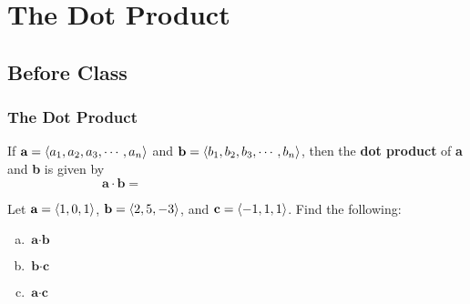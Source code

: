 \documentclass[notes]{subfiles}
\begin{document}
	\fancyhead[LO,RE]{\bfseries \small \currentname}
	\fancyfoot[C]{{}}
	\fancyfoot[RO,LE]{\large \thepage}	%
	
\section*{The Dot Product}\label{cs123}
	\subsection*{Before Class}
	\subsubsection*{The Dot Product}
		\begin{defn}
			If $\textbf{a} = \left\langle a_1,a_2,a_3,\cdots, a_n\right\rangle$ and $\textbf{b} =\left\langle b_1,b_2,b_3,\cdots, b_n\right\rangle$, then the \textbf{dot product} of \textbf{a} and \textbf{b} is given by\\[15pt]
				\[\textbf{a}\cdot\textbf{b} = \hspace{3in}\]
		\end{defn}
		
		\begin{ex}
			Let $\textbf{a} = \left\langle 1,0,1\right\rangle$, $\textbf{b} = \left\langle 2,5,-3\right\rangle$, and $\textbf{c} = \left\langle -1,1,1\right\rangle$.  Find the following:
			\begin{enumerate}[(a)]
				\item $\textbf{a}\cdot \textbf{b}$
					
				\item $\textbf{b}\cdot \textbf{c}$
					
				\item $\textbf{a}\cdot \textbf{c}$
			\end{enumerate}
		\end{ex}
			\newpage
	
\end{document}
